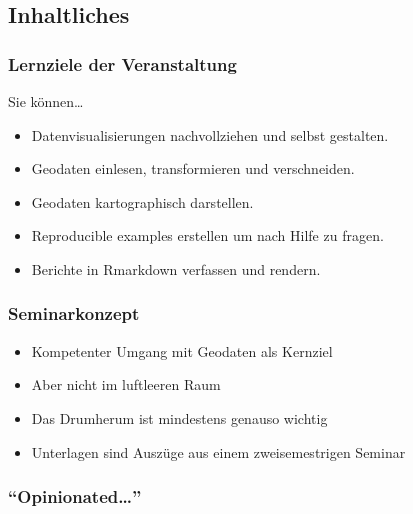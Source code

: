 \documentclass[11pt,german,a4paper]{article}
\providecommand{\tightlist}{%
  \setlength{\itemsep}{0pt}\setlength{\parskip}{0pt}}
\begin{document}
\hypertarget{inhaltliches}{%
\subsection{Inhaltliches}\label{inhaltliches}}

\hypertarget{lernziele-der-veranstaltung}{%
\subsubsection{Lernziele der Veranstaltung}\label{lernziele-der-veranstaltung}}

Sie können\ldots{}

\begin{itemize}
\tightlist
\item
  Datenvisualisierungen nachvollziehen und selbst gestalten.
\item
  Geodaten einlesen, transformieren und verschneiden.
\item
  Geodaten kartographisch darstellen.
\item
  Reproducible examples erstellen um nach Hilfe zu fragen.
\item
  Berichte in Rmarkdown verfassen und rendern.
\end{itemize}

\hypertarget{seminarkonzept}{%
\subsubsection{Seminarkonzept}\label{seminarkonzept}}

\begin{itemize}
\tightlist
\item
  Kompetenter Umgang mit Geodaten als Kernziel
\item
  Aber nicht im luftleeren Raum
\item
  Das Drumherum ist mindestens genauso wichtig
\item
  Unterlagen sind Auszüge aus einem zweisemestrigen Seminar
\end{itemize}

\hypertarget{opinionated}{%
\subsubsection{\texorpdfstring{``Opinionated\ldots{}''}{``Opinionated\ldots''}}\label{opinionated}}
\end{document}
